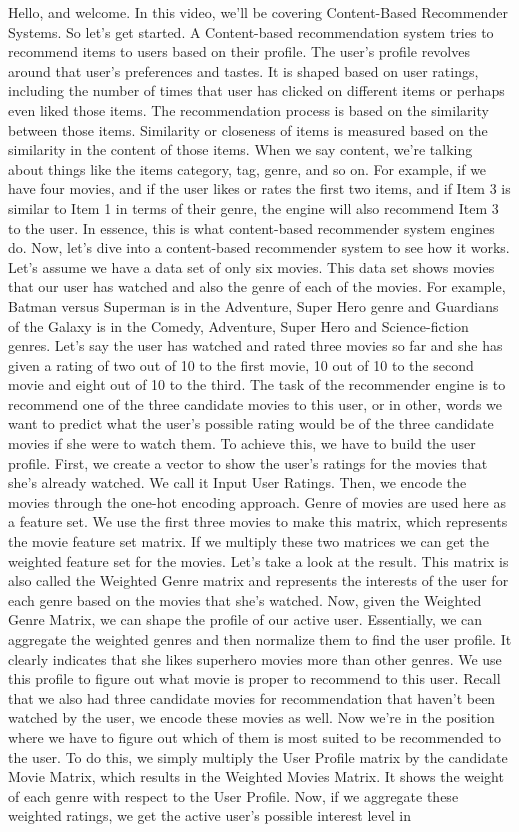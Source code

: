 	
	Hello, and welcome. In this video, we'll be covering Content-Based Recommender Systems. So let's get started. A Content-based recommendation system tries to recommend items to users based on their profile. The user's profile revolves around that user's preferences and tastes. It is shaped based on user ratings, including the number of times that user has clicked on different items or perhaps even liked those items. The recommendation process is based on the similarity between those items. Similarity or closeness of items is measured based on the similarity in the content of those items. When we say content, we're talking about things like the items category, tag, genre, and so on. For example, if we have four movies, and if the user likes or rates the first two items, and if Item 3 is similar to Item 1 in terms of their genre, the engine will also recommend Item 3 to the user. In essence, this is what content-based recommender system engines do. Now, let's dive into a content-based recommender system to see how it works. Let's assume we have a data set of only six movies. This data set shows movies that our user has watched and also the genre of each of the movies. For example, Batman versus Superman is in the Adventure, Super Hero genre and Guardians of the Galaxy is in the Comedy, Adventure, Super Hero and Science-fiction genres. Let's say the user has watched and rated three movies so far and she has given a rating of two out of 10 to the first movie, 10 out of 10 to the second movie and eight out of 10 to the third. The task of the recommender engine is to recommend one of the three candidate movies to this user, or in other, words we want to predict what the user's possible rating would be of the three candidate movies if she were to watch them. To achieve this, we have to build the user profile. First, we create a vector to show the user's ratings for the movies that she's already watched. We call it Input User Ratings. Then, we encode the movies through the one-hot encoding approach. Genre of movies are used here as a feature set. We use the first three movies to make this matrix, which represents the movie feature set matrix. If we multiply these two matrices we can get the weighted feature set for the movies. Let's take a look at the result. This matrix is also called the Weighted Genre matrix and represents the interests of the user for each genre based on the movies that she's watched. Now, given the Weighted Genre Matrix, we can shape the profile of our active user. Essentially, we can aggregate the weighted genres and then normalize them to find the user profile. It clearly indicates that she likes superhero movies more than other genres. We use this profile to figure out what movie is proper to recommend to this user. Recall that we also had three candidate movies for recommendation that haven't been watched by the user, we encode these movies as well. Now we're in the position where we have to figure out which of them is most suited to be recommended to the user. To do this, we simply multiply the User Profile matrix by the candidate Movie Matrix, which results in the Weighted Movies Matrix. It shows the weight of each genre with respect to the User Profile. Now, if we aggregate these weighted ratings, we get the active user's possible interest level in 